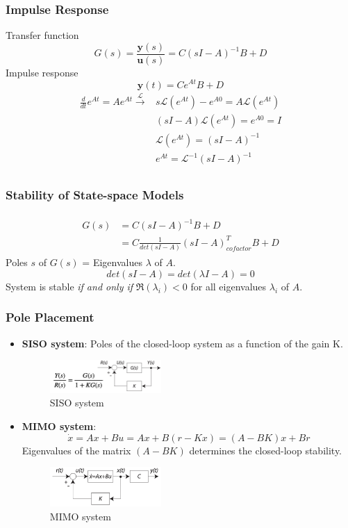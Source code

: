 \documentclass[12pt,a4paper]{article}
\begin{document}
\subsubsection{Impulse Response}
Transfer function\[G(s) = \frac{\mathbf{y}(s)}{\mathbf{u}(s)}=C(sI-A)^{-1}B+D\]
Impulse response\[\mathbf{y}(t) = Ce^{At}B+D\]
\begin{equation*}
\begin{split}
\frac{d}{dt}e^{At} = Ae^{At} \xrightarrow{\mathcal{L}} & s\mathcal{L}(e^{At})-e^{A0} = A\mathcal{L}(e^{At})\\
&(sI-A)\mathcal{L}(e^{At}) = e^{A0} = I\\
&\mathcal{L}(e^{At}) = (sI-A)^{-1}\\
&e^{At} = \mathcal{L}^{-1}(sI-A)^{-1}\\
\end{split}
\end{equation*}

\subsubsection{Stability of State-space Models}
\begin{align*}
\begin{split}
G(s) &= C(sI-A)^{-1}B+D\\
&=C\frac{1}{det(sI-A)}(sI-A)^{T}_{cofactor}B+D
\end{split}
\end{align*}
Poles $s$ of $G(s)$ = Eigenvalues $\lambda$ of $A$.
\[det(sI-A) = det(\lambda I-A) = 0\]
System is stable \textit{if and only if} $\Re (\lambda_{i})<0$ for all eigenvalues $\lambda_{i}$ of $A$.
 

\subsubsection{Pole Placement}
\begin{itemize}
\item \textbf{SISO system}: Poles of the closed-loop system as a function of the gain K.
\begin{figure}[H] \centering
\includegraphics[width=0.4\textwidth]{images/SISO.png}
\caption{SISO system}
\end{figure}
\item \textbf{MIMO system}: 
\[\dot{x} = Ax+Bu = Ax +B(r-Kx) = (A-BK)x+Br\]
Eigenvalues of the matrix $(A-BK)$ determines the closed-loop stability.
\begin{figure}[H] \centering
\includegraphics[width=0.4\textwidth]{images/MIMO.png}
\caption{MIMO system}
\end{figure}
\end{itemize}
\end{document}
